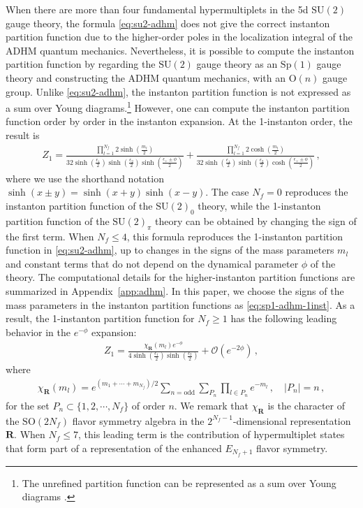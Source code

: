 \documentclass[11pt, a4paper]{article}
\theoremstyle{definition}
\begin{document}
When there are more than four fundamental hypermultiplets in the 5d $ \mathrm{SU}(2) $ gauge theory, the formula \eqref{eq:su2-adhm} does not give the correct instanton partition function due to the higher-order poles in the localization integral of the ADHM quantum mechanics. Nevertheless, it is possible to compute the instanton partition function by regarding the $ \mathrm{SU}(2) $ gauge theory as an $ \mathrm{Sp}(1) $ gauge theory and constructing the ADHM quantum mechanics, with an $ \mathrm{O}(n) $ gauge group. Unlike \eqref{eq:su2-adhm}, the instanton partition function is not expressed as a sum over Young diagrams.\footnote{The unrefined partition function can be represented as a sum over Young diagrams \cite{Nawata:2021dlk, Chen:2023smd}.} However, one can compute the instanton partition function order by order in the instanton expansion. At the 1-instanton order, the result is
\begin{align}\label{eq:sp1-adhm-1inst}
    Z_1 = \frac{\prod_{l=1}^{N_f} 2\sinh(\frac{m_l}{2})}{32\sinh(\frac{\epsilon_1}{2}) \sinh(\frac{\epsilon_2}{2}) \sinh(\frac{\epsilon_+\pm\phi}{2})} + \frac{\prod_{l=1}^{N_f} 2\cosh(\frac{m_l}{2})}{32\sinh(\frac{\epsilon_1}{2}) \sinh(\frac{\epsilon_2}{2}) \cosh(\frac{\epsilon_+\pm\phi}{2})} \, ,
\end{align}
where we use the shorthand notation $ \sinh(x\pm y) = \sinh(x+y) \sinh(x-y) $. The case $ N_f=0 $ reproduces the instanton partition function of the $ \mathrm{SU}(2)_0 $ theory, while the 1-instanton partition function of the $ \mathrm{SU}(2)_\pi $ theory can be obtained by changing the sign of the first term. When $ N_f \leq 4 $, this formula reproduces the 1-instanton partition function in \eqref{eq:su2-adhm}, up to changes in the signs of the mass parameters $ m_l $ and constant terms that do not depend on the dynamical parameter $ \phi $ of the theory. The computational details for the higher-instanton partition functions are summarized in Appendix~\ref{app:adhm}. In this paper, we choose the signs of the mass parameters in the instanton partition functions as \eqref{eq:sp1-adhm-1inst}. As a result, the 1-instanton partition function for $ N_f \geq 1 $ has the following leading behavior in the $ e^{-\phi} $ expansion:
\begin{align}\label{eq:1inst-leading}
    Z_1 = \frac{\chi_{\mathbf{R}}(m_l) e^{-\phi}}{4\sinh(\frac{\epsilon_1}{2}) \sinh(\frac{\epsilon_2}{2})} + \mathcal{O}(e^{-2\phi}) \, ,
\end{align}
where
\begin{align}
    \chi_{\mathbf{R}}(m_l) = e^{(m_1+\cdots+m_{N_f})/2} \sum_{n=\text{odd}} \sum_{P_{n}} \prod_{l \in P_n} e^{-m_l} \, , \quad
    |P_n| = n \, ,
\end{align}
for the set $ P_n \subset \{1,2,\cdots,N_f\} $ of order $ n $. We remark that $ \chi_{\mathbf{R}} $ is the character of the $ \mathrm{SO}(2N_f) $ flavor symmetry algebra in the $ 2^{N_f-1} $-dimensional representation $ \mathbf{R} $. When $ N_f \leq 7 $, this leading term is the contribution of hypermultiplet states that form part of a representation of the enhanced $ E_{N_f+1} $ flavor symmetry.
\end{document}
